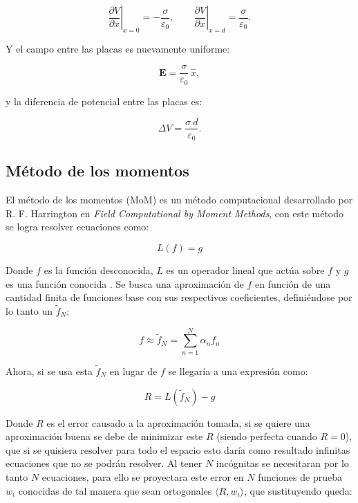 \documentclass[12pt, twocolumn]{article}
\begin{document}
\begin{equation}
    \left.\frac{\partial V}{\partial x}\right|_{x=0} = -\frac{\sigma}{\varepsilon_0},
    \qquad
    \left.\frac{\partial V}{\partial x}\right|_{x=d} = \frac{\sigma}{\varepsilon_0}.
    \label{eq:placas_neumann}
\end{equation}

Y el campo entre las placas es nuevamente uniforme:

\begin{equation}
    \mathbf{E} = \frac{\sigma}{\varepsilon_0}\,\hat{x},
    \label{eq:campo_neumann}
\end{equation}

y la diferencia de potencial entre las placas es:

\begin{equation}
    \Delta V = \frac{\sigma\ d}{\varepsilon_0}.
    \label{eq:delta_v}
\end{equation}

\subsection{Método de los momentos} \label{sec:mom}

El método de los momentos (MoM) es un método computacional desarrollado por R. F. Harrington en \textit{Field Computational by Moment Methods}, con este método se logra resolver ecuaciones como:

\begin{equation*}
    L(f) = g
\end{equation*}

Donde $f$ es la función desconocida, $L$ es un operador lineal que actúa sobre $f$ y $g$ es una función conocida \cite{MoM_og}. Se busca una aproximación de $f$ en función de una cantidad finita de funciones base con sus respectivos coeficientes, definiéndose por lo tanto un $\tilde{f}_N$:

\begin{equation*}
    f \approx \tilde{f}_N = \sum_{n=1}^{N}{\alpha_n f_n}
\end{equation*}

Ahora, si se usa esta $\tilde{f}_N$ en lugar de $f$ se llegaría a una expresión como:

\begin{equation*}
    R = L(\tilde{f}_N) - g  
\end{equation*}

Donde $R$ es el error causado a la aproximación tomada, si se quiere una aproximación buena se debe de minimizar este $R$ (siendo perfecta cuando $R=0$), que si se quisiera resolver para todo el espacio esto daría como resultado infinitas ecuaciones que no se podrán resolver. Al tener $N$ incógnitas se necesitaran por lo tanto $N$ ecuaciones, para ello se proyectara este error en $N$ funciones de prueba $w_i$ conocidas de tal manera que sean ortogonales $\langle R, w_i\rangle$, que sustituyendo queda:
\end{document}
